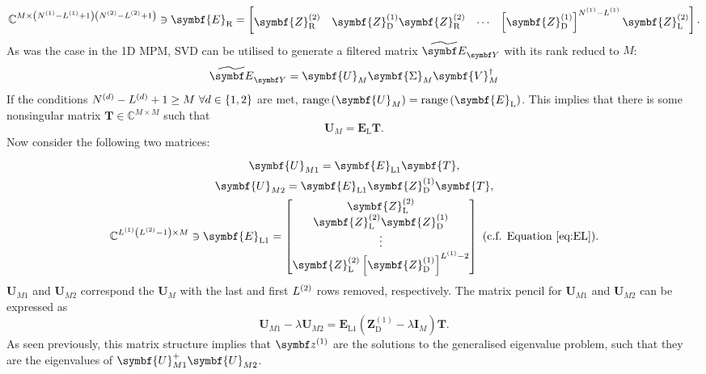 {\begin{subequations}
\begin{gather}
        \mathbb{C}^{M \times \left(\None - \Lone + 1\right)\left(\Ntwo - \Ltwo + 1\right)} \ni
        \symbf{E}_{\text{R}} =
        \begin{bmatrix}
            \symbf{Z}^{(2)}_{\text{R}} &
            \symbf{Z}^{(1)}_{\text{D}} \symbf{Z}^{(2)}_{\text{R}} &
            \cdots &
            \left[\symbf{Z}^{(1)}_{\text{D}}\right]^{\None - \Lone} \symbf{Z}^{(2)}_{\text{L}} \\
        \end{bmatrix}.
    \end{gather}
\end{subequations}
As was the case in the \ac{1D} \ac{MPM}, \ac{SVD} can be utilised to generate a
filtered matrix $\EYtilde$ with its rank reducd to $M$:
\begin{equation}
    \EYtilde =
        \symbf{U}_M^{\vphantom{\dagger}}
        \symbf{\Sigma}_M^{\vphantom{\dagger}}
        \symbf{V}_M^{\dagger}
\end{equation}
If the conditions $N^{(d)} - L^{(d)} + 1 \geq M\ \forall d \in \lbrace 1, 2
\rbrace$ are met, $\range\left(\symbf{U}_M\right) =
\range\left(\symbf{E}_{\text{L}}\right)$. This implies that there is some
nonsingular matrix $\symbf{T} \in \mathbb{C}^{M \times M}$ such that
\begin{equation}
    \symbf{U}_M = \symbf{E}_{\text{L}} \symbf{T}.
\end{equation}
Now consider the following two matrices:
\begin{subequations}
    \begin{gather}
        \symbf{U}_{M1} = \symbf{E}^{\vphantom{(1)}}_{\text{L}1} \symbf{T},\\
        \symbf{U}_{M2} = \symbf{E}^{\vphantom{(1)}}_{\text{L}1} \symbf{Z}^{(1)}_{\text{D}} \symbf{T},\\
        \mathbb{C}^{\Lone \left(\Ltwo - 1\right) \times M} \ni
        \symbf{E}_{\text{L}1} =
        \begin{bmatrix}
            \symbf{Z}^{(2)}_{\text{L}} \\
            \symbf{Z}^{(2)}_{\text{L}} \symbf{Z}^{(1)}_{\text{D}} \\
            \vdots \\
            \symbf{Z}^{(2)}_{\text{L}} \left[\symbf{Z}^{(1)}_{\text{D}}\right]^{\Lone - 2}
        \end{bmatrix} \text{ (c.f. Equation \ref{eq:EL}).}
    \end{gather}
\end{subequations}
$\symbf{U}_{M1}$ and $\symbf{U}_{M2}$ correspond the $\symbf{U}_M$ with the
last and first $L^{(2)}$ rows removed, respectively. The matrix pencil for
$\symbf{U}_{M1}$ and $\symbf{U}_{M2}$ can be expressed as
\begin{equation}
    \symbf{U}_{M1} - \lambda \symbf{U}_{M2} =
    \symbf{E}_{\text{L}1} \left( \symbf{Z}^{(1)}_{\text{D}} - \lambda \symbf{I}_M \right) \symbf{T}.
\end{equation}
As seen previously, this matrix structure implies that $\bdzone$ are the
solutions to the generalised eigenvalue problem, such that they are the eigenvalues of
$\symbf{U}_{M1}^{+} \symbf{U}_{M2}^{\vphantom{+}}$.

}
